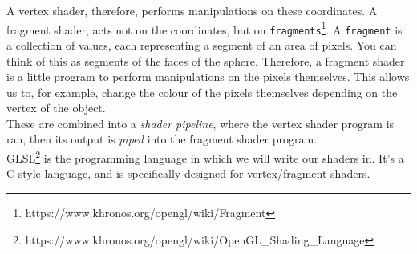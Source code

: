 A vertex shader, therefore, performs manipulations on these coordinates.
\newpage
A fragment shader, acts not on the coordinates, but on \verb|fragments|\footnote{https://www.khronos.org/opengl/wiki/Fragment}. A \verb|fragment| is a collection of values, each representing a segment of an area of pixels. You can think of this as segments of the faces of the sphere. Therefore, a fragment shader is a little program to perform manipulations on the pixels themselves. This allows us to, for example, change the colour of the pixels themselves depending on the vertex of the object. \\
These are combined into a \textit{shader pipeline}, where the vertex shader program is ran, then its output is \textit{piped} into the fragment shader program. \\
GLSL\footnote{https://www.khronos.org/opengl/wiki/OpenGL\_Shading\_Language} is the programming language in which we will write our shaders in. It's a C-style language, and is specifically designed for vertex/fragment shaders.

